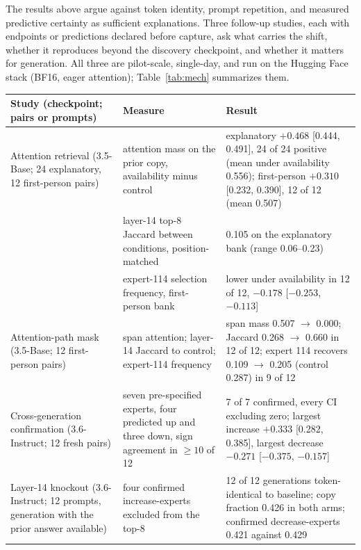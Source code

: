 \documentclass[10pt,a4paper,twocolumn]{article}
\begin{document}
The results above argue against token identity, prompt repetition, and
measured predictive certainty as sufficient explanations. Three follow-up
studies, each with endpoints or predictions declared before capture, ask what
carries the shift, whether it reproduces beyond the discovery checkpoint, and
whether it matters for generation. All three are pilot-scale, single-day, and
run on the Hugging Face stack (BF16, eager attention); Table~\ref{tab:mech}
summarizes them.

\begin{table}[!t]
\footnotesize
\begin{tabularx}{\textwidth}{@{}>{\raggedright\arraybackslash}p{}>{\raggedright\arraybackslash}p{}Y@{}}
\toprule
\textbf{Study (checkpoint; pairs or prompts)} & \textbf{Measure} & \textbf{Result} \\
\midrule
Attention retrieval (3.5-Base; 24 explanatory, 12 first-person pairs)
& attention mass on the prior copy, availability minus control
& explanatory \(+0.468\) [0.444, 0.491], 24 of 24 positive (mean under
availability 0.556); first-person \(+0.310\) [0.232, 0.390], 12 of 12
(mean 0.507) \\
& layer-14 top-8 Jaccard between conditions, position-matched
& 0.105 on the explanatory bank (range 0.06--0.23) \\
& expert-114 selection frequency, first-person bank
& lower under availability in 12 of 12, \(-0.178\) [\(-0.253\), \(-0.113\)] \\
\addlinespace
Attention-path mask (3.5-Base; 12 first-person pairs)
& span attention; layer-14 Jaccard to control; expert-114 frequency
& span mass 0.507 \(\rightarrow\) 0.000; Jaccard 0.268 \(\rightarrow\) 0.660
in 12 of 12; expert 114 recovers 0.109 \(\rightarrow\) 0.205 (control 0.287)
in 9 of 12 \\
\addlinespace
Cross-generation confirmation (3.6-Instruct; 12 fresh pairs)
& seven pre-specified experts, four predicted up and three down, sign
agreement in \(\ge 10\) of 12
& 7 of 7 confirmed, every CI excluding zero; largest increase \(+0.333\)
[0.282, 0.385], largest decrease \(-0.271\) [\(-0.375\), \(-0.157\)] \\
\addlinespace
Layer-14 knockout (3.6-Instruct; 12 prompts, generation with the prior
answer available)
& four confirmed increase-experts excluded from the top-8
& 12 of 12 generations token-identical to baseline; copy fraction 0.426 in
both arms; confirmed decrease-experts 0.421 against 0.429 \\

\end{tabularx}
\end{table}
\end{document}

